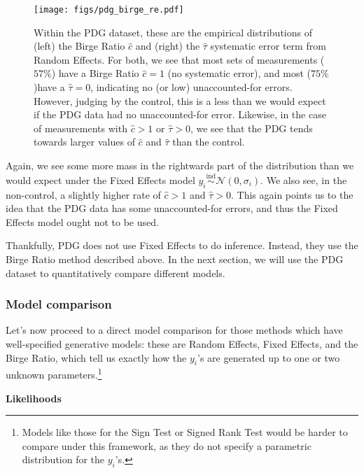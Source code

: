 \documentclass[letterpaper,12pt]{article}
\begin{document}
\begin{figure}[htbp]
\centering
\texttt{[image: figs/pdg\_birge\_re.pdf]}
\caption{Within the PDG dataset, these are the empirical distributions of (left) the Birge Ratio $\hat c$ and (right) the $\hat\tau$ systematic error term from Random Effects. For both, we see that most sets of measurements ($57\%$) have a Birge Ratio $\hat c=1$ (no systematic error), and most ($75\%$)have a $\hat\tau=0$, indicating no (or low) unaccounted-for errors. However, judging by the control, this is a less than we would expect if the PDG data had no unaccounted-for error. Likewise, in the case of measurements with $\hat c>1$ or $\hat\tau>0$, we see that the PDG tends towards larger values of $\hat c$ and $\hat\tau$ than the control.
}
\label{fig:pdg-birge-re}
\end{figure}


Again, we see some more mass in the rightwards part of the distribution than we would expect under the Fixed Effects model $y_i\overset{\mathrm{ind}}{\sim}\mathcal{N}(0, \sigma_i)$. We also see, in the non-control, a slightly higher rate of $\hat c >1$ and $\hat \tau > 0$. This again points us to the idea that the PDG data has some unaccounted-for errors, and thus the Fixed Effects model ought not to be used.

Thankfully, PDG does not use Fixed Effects to do inference. Instead, they use the Birge Ratio method described above. In the next section, we will use the PDG dataset to quantitatively compare different models.

\subsubsection{Model comparison}\label{model-comparison}

Let's now proceed to a direct model comparison for those methods which have well-specified generative models: these are Random Effects, Fixed Effects, and the Birge Ratio, which tell us exactly how the $y_i$'s are generated up to one or two unknown parameters.\footnote{Models like those for the Sign Test or Signed Rank Test would be harder to compare under this framework, as they do not specify a parametric distribution for the $y_i$'s.}

\textbf{Likelihoods}
\end{document}
